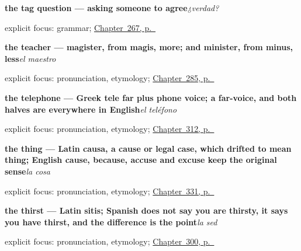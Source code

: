 \noindent\begin{minipage}[t]{\linewidth}
\raggedright
\textbf{the tag question — asking someone to agree}\enspace\emph{¿verdad?}\par
\footnotesize explicit focus: grammar; \hyperref[ch:es-negate-and-ask]{Chapter~267, p.~\pageref*{ch:es-negate-and-ask}}
\end{minipage}\par\smallskip

\noindent\begin{minipage}[t]{\linewidth}
\raggedright
\textbf{the teacher — magister, from magis, more; and minister, from minus, less}\enspace\emph{el maestro}\par
\footnotesize explicit focus: pronunciation, etymology; \hyperref[ch:quien-es]{Chapter~285, p.~\pageref*{ch:quien-es}}
\end{minipage}\par\smallskip

\noindent\begin{minipage}[t]{\linewidth}
\raggedright
\textbf{the telephone — Greek tele far plus phone voice; a far-voice, and both halves are everywhere in English}\enspace\emph{el teléfono}\par
\footnotesize explicit focus: pronunciation, etymology; \hyperref[ch:lo-que-llevas]{Chapter~312, p.~\pageref*{ch:lo-que-llevas}}
\end{minipage}\par\smallskip

\noindent\begin{minipage}[t]{\linewidth}
\raggedright
\textbf{the thing — Latin causa, a cause or legal case, which drifted to mean thing; English cause, because, accuse and excuse keep the original sense}\enspace\emph{la cosa}\par
\footnotesize explicit focus: pronunciation, etymology; \hyperref[ch:manera-y-asunto]{Chapter~331, p.~\pageref*{ch:manera-y-asunto}}
\end{minipage}\par\smallskip

\noindent\begin{minipage}[t]{\linewidth}
\raggedright
\textbf{the thirst — Latin sitis; Spanish does not say you are thirsty, it says you have thirst, and the difference is the point}\enspace\emph{la sed}\par
\footnotesize explicit focus: pronunciation, etymology; \hyperref[ch:el-cuerpo-dice]{Chapter~300, p.~\pageref*{ch:el-cuerpo-dice}}
\end{minipage}\par\smallskip


